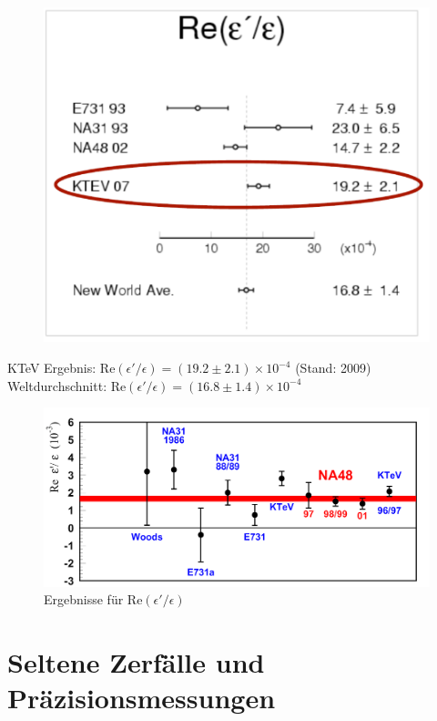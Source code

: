 \documentclass[aspectratio=1610, professionalfonts, 9pt, t]{beamer}
\begin{document}
  \begin{frame}
    \begin{figure}
      \includegraphics[height=0.7\textheight]{Images/ktevaverage.png}
    \end{figure}
    KTeV Ergebnis: Re$(\epsilon' / \epsilon) = (19.2\pm2.1) \times 10^{-4}$ (Stand: 2009)
    \newline
    Weltdurchschnitt: Re$(\epsilon' / \epsilon) = (16.8\pm1.4) \times 10^{-4}$
  \end{frame}

  \begin{frame}
    \begin{figure}[ht]
      \includegraphics[height=0.8\textheight]{Images/REEE.png}
      \caption{Ergebnisse für Re$(\epsilon' / \epsilon) $}
    \end{figure}
  \end{frame}

\section{Seltene Zerfälle und Präzisionsmessungen}
\end{document}

